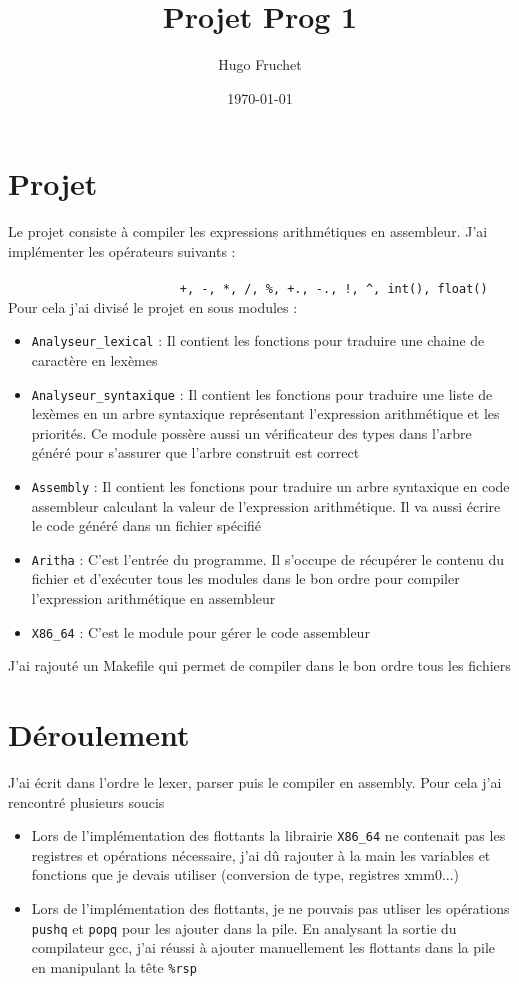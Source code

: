 \documentclass{report}
\title{Projet Prog 1}
\author{Hugo Fruchet}
\date{\today}
\begin{document}
\maketitle
\section{Projet}
Le projet consiste à compiler les expressions arithmétiques en assembleur. J'ai implémenter les opérateurs suivants : \\ \\
{\verb|                        +, -, *, /, %, +., -., !, ^, int(), float()|} \\
Pour cela j'ai divisé le projet en sous modules :
\begin{itemize}
  \item \verb|Analyseur_lexical| : Il contient les fonctions pour traduire une chaine de caractère en lexèmes
  \item \verb|Analyseur_syntaxique| : Il contient les fonctions pour traduire une liste de lexèmes en un arbre syntaxique représentant l'expression arithmétique et les priorités. Ce module possère aussi un vérificateur des types dans l'arbre généré pour s'assurer que l'arbre construit est correct
  \item \verb|Assembly| : Il contient les fonctions pour traduire un arbre syntaxique en code assembleur calculant la valeur de l'expression arithmétique. Il va aussi écrire le code généré dans un fichier spécifié
  \item \verb|Aritha| : C'est l'entrée du programme. Il s'occupe de récupérer le contenu du fichier et d'exécuter tous les modules dans le bon ordre pour compiler l'expression arithmétique en assembleur
  \item \verb|X86_64| : C'est le module pour gérer le code assembleur
\end{itemize}
J'ai rajouté un Makefile qui permet de compiler dans le bon ordre tous les fichiers

\section{Déroulement}
J'ai écrit dans l'ordre le lexer, parser puis le compiler en assembly. Pour cela j'ai rencontré plusieurs soucis
\begin{itemize}
  \item Lors de l'implémentation des flottants la librairie \verb|X86_64| ne contenait pas les registres et opérations nécessaire, j'ai dû rajouter à la main les variables et fonctions que je devais utiliser (conversion de type, registres xmm0...)
  \item Lors de l'implémentation des flottants, je ne pouvais pas utliser les opérations \verb|pushq| et \verb|popq| pour les ajouter dans la pile. En analysant la sortie du compilateur gcc, j'ai réussi à ajouter manuellement les flottants dans la pile en manipulant la tête \verb|%rsp|
\end{itemize}
\end{document}
